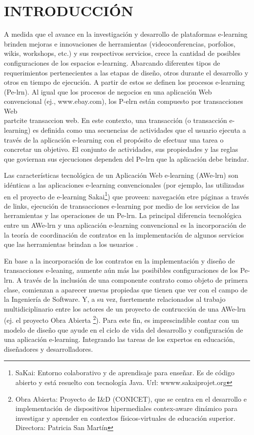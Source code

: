 \documentclass[12 pt,a4paper]{llncs}
\begin{document}
\newpage

\section {INTRODUCCIÓN} \label{intro}

A medida que el avance en la investigación y desarrollo de plataformas e-learning brinden  mejoras e innovaciones de herramientas (videoconferencias, porfolios, wikis, workshops, etc.) y sus respectivos servicios,  crece la cantidad de posibles configuraciones de los espacios e-learning.  Abarcando diferentes tipos de requerimientos pertenecientes a las etapas de diseño, otros durante el desarrollo y otros en tiempo de ejecución. A partir de estos se definen los procesos e-learning (Pe-lrn). Al igual que los procesos de negocios en una aplicación Web convencional (ej., www.ebay.com), los P-elrn están compuesto por transacciones Web \\part{cite}
{transaccion web}. En este contexto, una transacción (o transacción e-learning) es definida como una secuencias de actividades que el usuario ejecuta a través de la aplicación e-learning con el propósito de efectuar una tarea o concretar un objetivo. El conjunto de actividades, sus propiedades y las reglas que goviernan sus ejecuciones dependen del Pe-lrn que la aplicación debe brindar.

Las características tecnológica de un Aplicación Web e-learning (AWe-lrn) son idénticas a las aplicaciones e-learning convencionales (por ejemplo, las utilizadas en el proyecto de e-learning Sakai\footnote{SaKai: Entorno colaborativo y de aprendisaje para enseñar. Es de código abierto y está resuelto con tecnología Java. Url: wwww.sakaiprojet.org}) que proveen:  navegación etre páginas a través de links, ejecución de transacciones e-learning por medio de los servicios de las herramientas y las operaciones de un Pe-lrn. La principal diferencia tecnológica entre un AWe-lrn y una aplicación e-learning convencional es la incorporación de la teoría de coordinación de contratos \cite{fiadeiro,libro5} en la implementación de algunos servicios que las herramientas brindan a los usuarios \cite{libro}.

En base a la incorporación de los contratos en la implementación y diseño de transacciones e-leaning, aumente aún más las posibibles configuraciones de los Pe-lrn. A través de la inclusión de una componente contrato como objeto de primera clase, comienzan a aparecer nuevas propiedas que tienen que ver con el campo de la Ingeniería de Software. Y, a su vez,  fuertemente relacionados al trabajo multidiciplinario entre los actores de un proyecto de contrucción de una AWe-lrn (ej. el proyecto Obra Abierta \footnote{Obra Abierta: Proyecto de I&D (CONICET), que se centra en el desarrollo e implementación de dispositivos hipermediales contex-aware dinámico para investigar y aprender en contextos físicos-virtuales de educación superior. Directora: Patricia San Martín }). Para este fin, es imprescindible contar con un modelo de diseño que ayude en el ciclo de vida del desarrollo y configuración de una aplicación e-learning. Integrando las tareas de los expertos en educación, diseñadores y desarrolladores.
\end{document}
